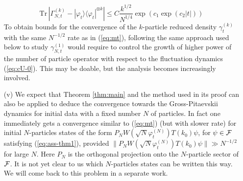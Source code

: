 \documentclass[11pt,a4paper]{article}
\newtheorem{thm}{Theorem}[section]  %
\newcommand{\eps}{\varepsilon}
\newcommand{\bR}{{\mathbb R}}
\newcommand{\bN}{{\mathbb N}}
\newcommand{\tr}{\mbox{Tr}}
\newcommand{\cF}{{\cal F}}
\newcommand{\cH}{{\cal H}}
\newcommand{\ph}{\varphi_t^{(N)}}	%
\begin{document}
\begin{itemize}
\[ \tr \, \left| \Gamma^{(k)}_{N,t} - |\varphi_t \rangle \langle \varphi_t|^{\otimes k} \right| \leq C \frac{k^{1/2}}{N^{1/4}} \exp (c_1 \exp (c_2 |t|)) \]
To obtain bounds for the convergence of the $k$-particle reduced density $\gamma^{(k)}_t$ with the same $N^{-1/2}$ rate as in (\ref{eq:mt}), following the same approach used below to study $\gamma^{(1)}_{N,t}$ would require to control the growth of higher power of the number of particle operator with respect to the fluctuation dynamics (\ref{eq:cU-0}). This may be doable, but the analysis becomes increasingly involved. 
\item[(v)] We expect that Theorem \ref{thm:main} and the method used in its proof can also be applied to deduce the convergence towards the Gross-Pitaevskii dynamics for initial data with a fixed number $N$ of particles. In fact one immediately gets a convergence similar to (\ref{eq:mt}) (but with slower rate) for initial $N$-particles states of the form $P_N W(\sqrt{N} \ph) T(k_0) \psi$, for $\psi \in \cF$
satisfying (\ref{eq:ass-thm1}), provided $\| P_N W(\sqrt{N} \ph) T(k_0) \psi \| \gg N^{-1/2}$ for large $N$. Here $P_N$ is the orthogonal projection onto the $N$-particle sector of $\cF$. It is not yet clear to us which $N$-particles states can be written this way. We will come back to this problem in a separate work.
\end{itemize}

\end{document}
